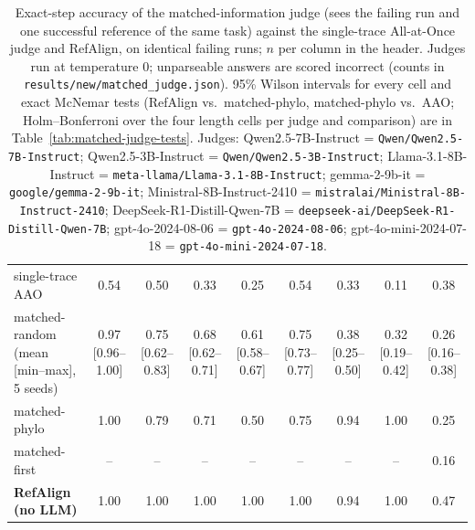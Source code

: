 \begin{table}[t]
\begin{tabular}{lcccccccc}
single-trace AAO & 0.54 & 0.50 & 0.33 & 0.25 & 0.54 & 0.33 & 0.11 & 0.38 \\
matched-random (mean [min--max], 5 seeds) & 0.97 [0.96--1.00] & 0.75 [0.62--0.83] & 0.68 [0.62--0.71] & 0.61 [0.58--0.67] & 0.75 [0.73--0.77] & 0.38 [0.25--0.50] & 0.32 [0.19--0.42] & 0.26 [0.16--0.38] \\
matched-phylo & 1.00 & 0.79 & 0.71 & 0.50 & 0.75 & 0.94 & 1.00 & 0.25 \\
matched-first & -- & -- & -- & -- & -- & -- & -- & 0.16 \\
\midrule
\textbf{RefAlign (no LLM)} & 1.00 & 1.00 & 1.00 & 1.00 & 1.00 & 0.94 & 1.00 & 0.47 \\
\bottomrule
\end{tabular}
\caption{Exact-step accuracy of the matched-information judge (sees the failing run and one successful reference of the same task) against the single-trace All-at-Once judge and RefAlign, on identical failing runs; $n$ per column in the header. Judges run at temperature 0; unparseable answers are scored incorrect (counts in \texttt{results/new/matched\_judge.json}). 95\% Wilson intervals for every cell and exact McNemar tests (RefAlign vs.\ matched-phylo, matched-phylo vs.\ AAO; Holm--Bonferroni over the four length cells per judge and comparison) are in Table~\ref{tab:matched-judge-tests}. Judges: Qwen2.5-7B-Instruct = \texttt{Qwen/Qwen2.5-7B-Instruct}; Qwen2.5-3B-Instruct = \texttt{Qwen/Qwen2.5-3B-Instruct}; Llama-3.1-8B-Instruct = \texttt{meta-llama/Llama-3.1-8B-Instruct}; gemma-2-9b-it = \texttt{google/gemma-2-9b-it}; Ministral-8B-Instruct-2410 = \texttt{mistralai/Ministral-8B-Instruct-2410}; DeepSeek-R1-Distill-Qwen-7B = \texttt{deepseek-ai/DeepSeek-R1-Distill-Qwen-7B}; gpt-4o-2024-08-06 = \texttt{gpt-4o-2024-08-06}; gpt-4o-mini-2024-07-18 = \texttt{gpt-4o-mini-2024-07-18}.}
\label{tab:matched-judge}
\end{table}
